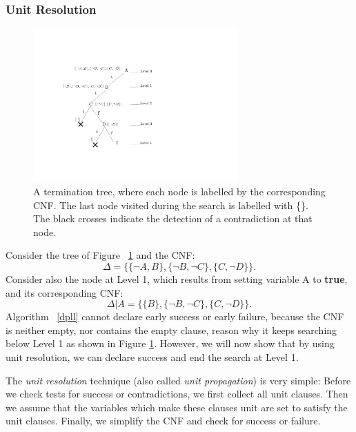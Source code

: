 \documentclass[12pt]{diicc}
\begin{document}
\subsubsection{Unit Resolution}

\begin{figure}[h!]
	\centering
		\includegraphics[width=0.7\textwidth]{termination_trees}
	\caption{A termination tree, where each node is labelled by the corresponding CNF. The last node visited during the search is labelled with \{\}. The black crosses indicate the detection of a contradiction at that node.}
	\label{fig:terminationtree}
\end{figure}

Consider the tree of Figure ~\ref{fig:terminationtree} and the CNF:
\[\Delta=\{\{\neg A,B\},\{\neg B,\neg C\},\{C,\neg D\}\}.\]
Consider also the node at Level 1, which results from setting variable A to \textbf{true}, and its corresponding CNF:
\[\Delta |A=\{\{B\},\{\neg B,\neg C\},\{C,\neg D\}\}.\]
Algorithm ~\ref{dpll} cannot declare early success or early failure, because the CNF is neither empty, nor contains the empty clause, reason why it keeps searching below Level 1 as shown in Figure \ref{fig:terminationtree}. However, we will now show that by using unit resolution, we can declare success and end the search at Level 1.

The \textit{unit resolution} technique (also called \textit{unit propagation}) is very simple: Before we check tests for success or contradictions, we first collect all unit clauses. Then we assume that the variables which make these clauses unit are set to satisfy the unit clauses. Finally, we simplify the CNF and check for success or failure.
\end{document}
